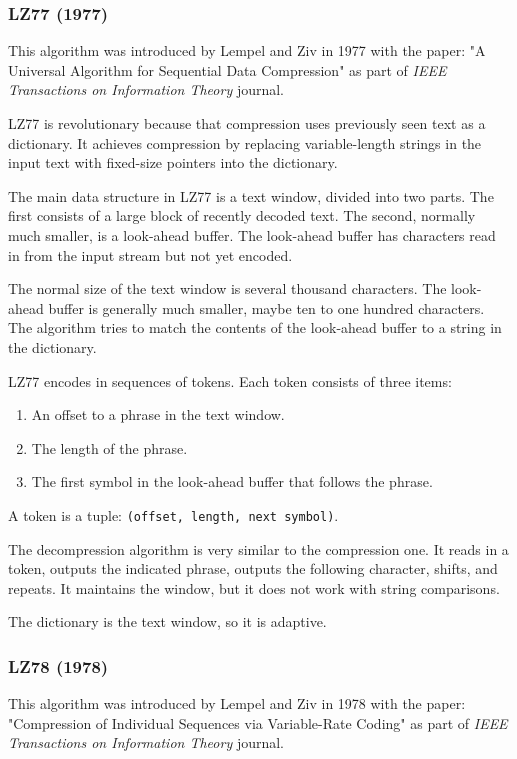 \documentclass[12pt, a4paper]{report}
\begin{document}
\subsubsection{LZ77 (1977)}

This algorithm was introduced by Lempel and Ziv in 1977 with the paper: "A Universal Algorithm for Sequential Data Compression"
as part of \textit{IEEE Transactions on Information Theory} journal.

LZ77 is revolutionary because that compression uses previously seen text as a dictionary.
It achieves compression by replacing variable-length strings in the input text with fixed-size pointers into the dictionary.

The main data structure in LZ77 is a text window, divided into two parts.
The first consists of a large block of recently decoded text.
The second, normally much smaller, is a look-ahead buffer.
The look-ahead buffer has characters read in from the input stream but not yet encoded.

The normal size of the text window is several thousand characters.
The look-ahead buffer is generally much smaller, maybe ten to one hundred characters.
The algorithm tries to match the contents of the look-ahead buffer to a string in the dictionary.

LZ77 encodes in sequences of tokens.
Each token consists of three items:

\begin{enumerate}
  \item An offset to a phrase in the text window.
  \item The length of the phrase.
  \item The first symbol in the look-ahead buffer that follows the phrase.
\end{enumerate}

A token is a tuple: \texttt{(offset, length, next symbol)}.

The decompression algorithm is very similar to the compression one.
It reads in a token, outputs the indicated phrase, outputs the following character, shifts, and repeats.
It maintains the window, but it does not work with string comparisons.

The dictionary is the text window, so it is adaptive.

\subsubsection{LZ78 (1978)}

This algorithm was introduced by Lempel and Ziv in 1978 with the paper: "Compression of Individual Sequences via Variable-Rate
Coding" as part of \textit{IEEE Transactions on Information Theory} journal.
\end{document}
